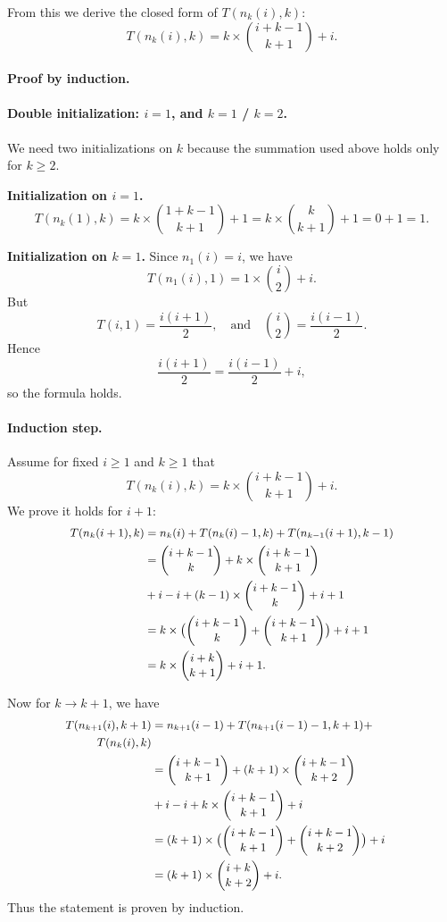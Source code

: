 \documentclass[a4paper,10pt]{article}
\begin{document}
From this we derive the closed form of \(T(n_k(i),k)\):
\[
T(n_k(i), k) = k \times \binom{i + k - 1}{k+1} + i.
\]

\paragraph*{Proof by induction.}

\paragraph*{Double initialization: \(i=1\), and \(k=1\) / \(k=2\).}
We need two initializations on \(k\) because the summation used above holds only for \(k \ge 2\).

\medskip
\noindent\textbf{Initialization on \(i=1\).}
\[
T(n_k(1), k)
  = k \times \binom{1 + k - 1}{k+1} + 1
  = k \times \binom{k}{k+1} + 1
  = 0 + 1
  = 1.
\]

\medskip
\noindent\textbf{Initialization on \(k=1\).}
Since \(n_1(i) = i\), we have
\[
T(n_1(i), 1) = 1 \times \binom{i}{2} + i.
\]
But
\[
T(i,1) = \frac{i(i+1)}{2}, \quad \text{and} \quad \binom{i}{2} = \frac{i(i-1)}{2}.
\]
Hence
\[
\frac{i(i+1)}{2} = \frac{i(i-1)}{2} + i,
\]
so the formula holds.

\paragraph*{Induction step.}

Assume for fixed \(i\ge 1\) and \(k\ge 1\) that
\[
T(n_k(i), k) = k\times \binom{i + k - 1}{k+1} + i.
\]
We prove it holds for \(i+1\):
\[
\small
\begin{aligned}
T(n_k(i+1),k)
  &= n_k(i) + T(n_k(i)-1,k) + T(n_{k-1}(i+1),k-1) \\
  &= \binom{i+k-1}{k} + k \times \binom{i+k-1}{k+1} \\
  &+ i - i + (k-1)\times \binom{i + k - 1}{k} + i + 1 \\
  &= k \times \bigl( \binom{i + k - 1}{k} + \binom{i + k - 1}{k+1} \bigr) + i + 1 \\
  &= k \times \binom{i + k}{k+1} + i + 1.
\end{aligned}
\]

Now for \(k \to k+1\), we have
\[
\small
\begin{aligned}
T(n_{k+1}(i),k+1)
  &= n_{k+1}(i-1) + T(n_{k+1}(i-1)-1,k+1) + &\\ T(n_k(i),k) \\
  &= \binom{i+k-1}{k+1} + (k+1)\times \binom{i+k-1}{k+2} \\
  &+ i - i+ k\times \binom{i + k - 1}{k + 1} + i \\
  &= (k+1)\times\bigl( \binom{i+k-1}{k+1} + \binom{i+k-1}{k+2} \bigr) + i \\
  &= (k+1) \times \binom{i + k}{k + 2} + i.
\end{aligned}
\]
Thus the statement is proven by induction.
\end{document}
